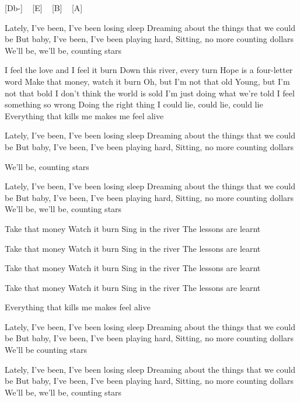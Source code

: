 

[Db-] ~ [E] ~ [B] ~ [A]~

Lately, I've been, I've been losing sleep
Dreaming about the things that we could be
But baby, I've been, I've been playing hard,
Sitting, no more counting dollars
We'll be, we'll be, counting stars


I feel the love and I feel it burn
Down this river, every turn
Hope is a four-letter word
Make that money, watch it burn
Oh, but I'm not that old
Young, but I'm not that bold
I don't think the world is sold
I'm just doing what we're told
I feel something so wrong
Doing the right thing
I could lie, could lie, could lie
Everything that kills me makes me feel alive

Lately, I've been, I've been losing sleep
Dreaming about the things that we could be
But baby, I've been, I've been playing hard,
Sitting, no more counting dollars

We'll be, counting stars

Lately, I've been, I've been losing sleep
Dreaming about the things that we could be
But baby, I've been, I've been playing hard,
Sitting, no more counting dollars
We'll be, we'll be, counting stars

Take that money
Watch it burn
Sing in the river
The lessons are learnt

Take that money
Watch it burn
Sing in the river
The lessons are learnt


Take that money
Watch it burn
Sing in the river
The lessons are learnt

Take that money
Watch it burn
Sing in the river
The lessons are learnt

Everything that kills me makes feel alive

Lately, I've been, I've been losing sleep
Dreaming about the things that we could be
But baby, I've been, I've been playing hard,
Sitting, no more counting dollars
We'll be counting stars


Lately, I've been, I've been losing sleep
Dreaming about the things that we could be
But baby, I've been, I've been playing hard,
Sitting, no more counting dollars
We'll be, we'll be, counting stars 